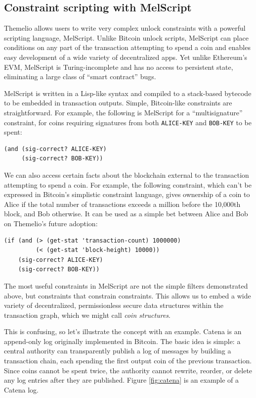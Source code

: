 \documentclass[headinclude]{scrbook}
\begin{document}
\subsection{Constraint scripting with MelScript}

Themelio allows users to write very complex unlock constraints with a powerful scripting language, MelScript. Unlike Bitcoin unlock scripts, MelScript can place conditions on any part of the transaction attempting to spend a coin and enables easy development of a wide variety of decentralized apps. Yet unlike Ethereum's EVM, MelScript is Turing-incomplete and has no access to persistent state, eliminating a large class of ``smart contract'' bugs.

MelScript is written in a Lisp-like syntax and compiled to a stack-based bytecode to be embedded in transaction outputs. Simple, Bitcoin-like constraints are straightforward. For example, the following is MelScript for a ``multisignature'' constraint, for coins requiring signatures from both \texttt{ALICE-KEY} and \texttt{BOB-KEY} to be spent:
\begin{lstlisting}
(and (sig-correct? ALICE-KEY)
     (sig-correct? BOB-KEY))
\end{lstlisting}

We can also access certain facts about the blockchain external to the transaction attempting to spend a coin. For example, the following constraint, which can't be expressed in Bitcoin's simplistic constraint language, gives ownership of a coin to Alice if the total number of transactions exceeds a million before the 10,000th block, and Bob otherwise. It can be used as a simple bet between Alice and Bob on Themelio's future adoption:
\begin{lstlisting}
(if (and (> (get-stat 'transaction-count) 1000000)
         (< (get-stat 'block-height) 10000))
    (sig-correct? ALICE-KEY)
    (sig-correct? BOB-KEY))
\end{lstlisting}

The most useful constraints in MelScript are not the simple filters demonstrated above, but constraints that constrain constraints. This allows us to embed a wide variety of decentralized, permissionless secure data structures within the transaction graph, which we might call \emph{coin structures}.

This is confusing, so let's illustrate the concept with an example. Catena \cite{tomescu2017catena} is an append-only log originally implemented in Bitcoin. The basic idea is simple: a central authority can transparently publish a log of messages by building a transaction chain, each spending the first output coin of the previous transaction. Since coins cannot be spent twice, the authority cannot rewrite, reorder, or delete any log entries after they are published. Figure \ref{fig:catena} is an example of a Catena log.
\end{document}
